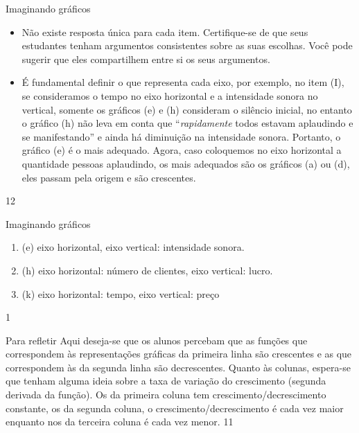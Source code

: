 \begin{sugestions}{Imaginando gráficos}
{
\begin{itemize}
\item Não existe resposta única para cada item. Certifique-se de que seus estudantes tenham argumentos consistentes sobre as suas escolhas. Você pode sugerir que eles compartilhem entre si os seus argumentos.

\item É fundamental definir o que representa cada eixo, por exemplo, no item (I), se consideramos o tempo no eixo horizontal e a intensidade sonora no vertical, somente os gráficos (e) e (h) consideram o silêncio inicial, no entanto o gráfico (h) não leva em conta que “\textit{rapidamente} todos estavam aplaudindo e se manifestando”{} e ainda há diminuição na intensidade sonora. Portanto, o gráfico (e) é o mais adequado. Agora, caso coloquemos no eixo horizontal a quantidade pessoas aplaudindo, os mais adequados são os gráficos (a) ou (d), eles passam pela origem e são crescentes.
\end{itemize}
}{1}{2}
\end{sugestions}
\begin{answer}{Imaginando gráficos}
{
\begin{enumerate}[label=($\Roman*$)]
\item (e) eixo horizontal, eixo vertical: intensidade sonora.

\item (h) eixo horizontal: número de clientes, eixo vertical: lucro.

\item (k) eixo horizontal: tempo, eixo vertical: preço
\end{enumerate}
}{1}
\end{answer}
\clearmargin
\begin{objectives}{Para refletir}
{
  Aqui deseja-se que os alunos percebam que as funções que correspondem às representações gráficas da primeira linha são crescentes e as que correspondem às da segunda linha são decrescentes. Quanto às colunas, espera-se que tenham alguma ideia sobre a taxa de variação do crescimento (segunda derivada da função). Os da primeira coluna tem crescimento/decrescimento constante, os da segunda coluna, o crescimento/decrescimento é cada vez maior enquanto nos da terceira coluna é cada vez menor.
}{1}{1}
\end{objectives}

